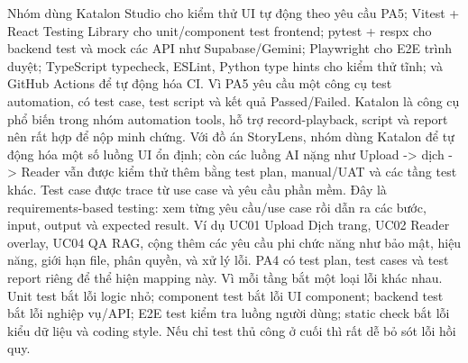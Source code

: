 {}
\markdownRendererSectionEnd \markdownRendererSectionBegin
{}\markdownRendererInterblockSeparator
{}\markdownRendererSectionBegin
{}\markdownRendererInterblockSeparator
{}Nhóm dùng Katalon Studio cho kiểm thử UI tự động theo yêu cầu PA5; Vitest + React Testing Library cho unit/component test frontend; pytest + respx cho backend test và mock các API như Supabase/Gemini; Playwright cho E2E trình duyệt; TypeScript typecheck, ESLint, Python type hints cho kiểm thử tĩnh; và GitHub Actions để tự động hóa CI.\markdownRendererInterblockSeparator
{}
\markdownRendererSectionEnd \markdownRendererSectionBegin
{}\markdownRendererInterblockSeparator
{}Vì PA5 yêu cầu một công cụ test automation, có test case, test script và kết quả Passed/Failed. Katalon là công cụ phổ biến trong nhóm automation tools, hỗ trợ record-playback, script và report nên rất hợp để nộp minh chứng.\markdownRendererParagraphSeparator
{}Với đồ án StoryLens, nhóm dùng Katalon để tự động hóa một số luồng UI ổn định; còn các luồng AI nặng như Upload -> dịch -> Reader vẫn được kiểm thử thêm bằng test plan, manual/UAT và các tầng test khác.\markdownRendererInterblockSeparator
{}
\markdownRendererSectionEnd \markdownRendererSectionBegin
{}\markdownRendererInterblockSeparator
{}Test case được trace từ use case và yêu cầu phần mềm. Đây là requirements-based testing: xem từng yêu cầu/use case rồi dẫn ra các bước, input, output và expected result.\markdownRendererParagraphSeparator
{}Ví dụ UC01 Upload \markdownRendererAmpersand{} Dịch trang, UC02 Reader overlay, UC04 Q\markdownRendererAmpersand{}A RAG, cộng thêm các yêu cầu phi chức năng như bảo mật, hiệu năng, giới hạn file, phân quyền, và xử lý lỗi. PA4 có test plan, test cases và test report riêng để thể hiện mapping này.\markdownRendererInterblockSeparator
{}
\markdownRendererSectionEnd \markdownRendererSectionBegin
{}\markdownRendererInterblockSeparator
{}Vì mỗi tầng bắt một loại lỗi khác nhau. Unit test bắt lỗi logic nhỏ; component test bắt lỗi UI component; backend test bắt lỗi nghiệp vụ/API; E2E test kiểm tra luồng người dùng; static check bắt lỗi kiểu dữ liệu và coding style.\markdownRendererParagraphSeparator
{}Nếu chỉ test thủ công ở cuối thì rất dễ bỏ sót lỗi hồi quy.\markdownRendererInterblockSeparator
{}
\markdownRendererSectionEnd \markdownRendererSectionBegin
